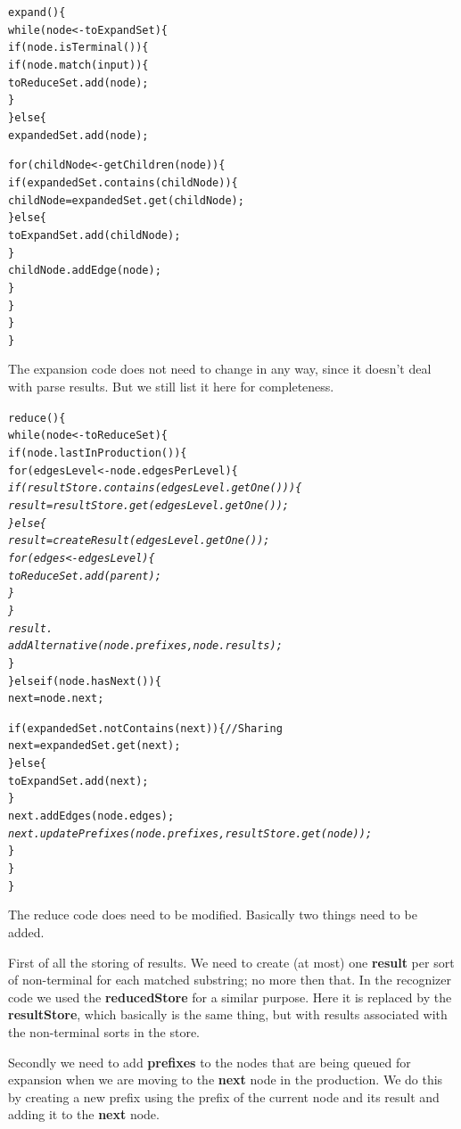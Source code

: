 \documentclass[a4paper,10pt]{article}
\begin{document}
{\small
\begin{alltt}
expand()\{
  while(node <- toExpandSet)\{
    if(node.isTerminal())\{
      if(node.match(input))\{
        toReduceSet.add(node);
      \}
    \}else\{
      expandedSet.add(node);
      
      for(childNode <- getChildren(node))\{
        if(expandedSet.contains(childNode))\{
          childNode = expandedSet.get(childNode);
        \}else\{
          toExpandSet.add(childNode);
        \}
        childNode.addEdge(node);
      \}
    \}
  \}
\}
\end{alltt}
}

The expansion code does not need to change in any way, since it doesn't deal with parse results. But we still list it here for completeness.

{\small
\begin{alltt}
reduce()\{
  while(node <- toReduceSet)\{
    if(node.lastInProduction())\{
      for(edgesLevel <- node.edgesPerLevel)\{\textit{
        if(resultStore.contains(edgesLevel.getOne()))\{
          result = resultStore.get(edgesLevel.getOne());
        \}else\{
          result = createResult(edgesLevel.getOne());
          for(edges <- edgesLevel)\{
            toReduceSet.add(parent);
          \}
        \}
        result.
            addAlternative(node.prefixes, node.results);}
      \}
    \}else if(node.hasNext())\{
      next = node.next;
      
      if(expandedSet.notContains(next))\{ // Sharing
        next = expandedSet.get(next);
      \}else\{
        toExpandSet.add(next);
      \}
      next.addEdges(node.edges);\textit{
      next.updatePrefixes(node.prefixes, resultStore.get(node));}
    \}
  \}
\}
\end{alltt}
}

The reduce code does need to be modified. Basically two things need to be added.

First of all the storing of results. We need to create (at most) one {\bf result} per sort of non-terminal for each matched substring; no more then that. In the recognizer code we used the {\bf reducedStore} for a similar purpose. Here it is replaced by the {\bf resultStore}, which basically is the same thing, but with results associated with the non-terminal sorts in the store.

Secondly we need to add {\bf prefixes} to the nodes that are being queued for expansion when we are moving to the {\bf next} node in the production. We do this by creating a new prefix using the prefix of the current node and its result and adding it to the {\bf next} node.
\end{document}
